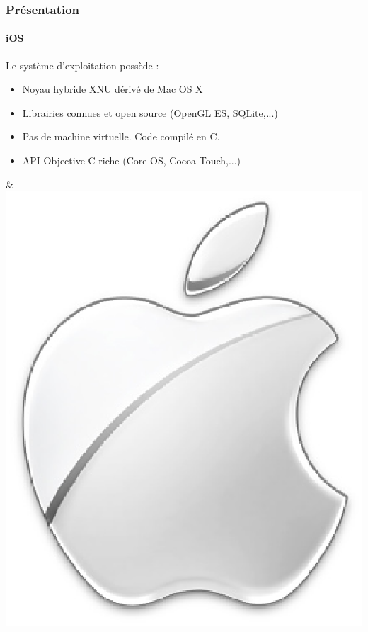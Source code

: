 \begin{frame}
\frametitle{Présentation}
\framesubtitle{iOS}
	\begin{minipage}{8cm}
Le système d'exploitation possède : \\

	\begin{itemize} 
		\item Noyau hybride XNU dérivé de Mac OS X
		\item Librairies connues et open source (OpenGL ES, SQLite,...)
		\item Pas de machine virtuelle. Code compilé en C.
		\item API Objective-C riche (Core OS, Cocoa Touch,...)
	\end{itemize}
	\end{minipage} & \includegraphics[scale=0.2]{img/apple.eps} 
\end{frame}




